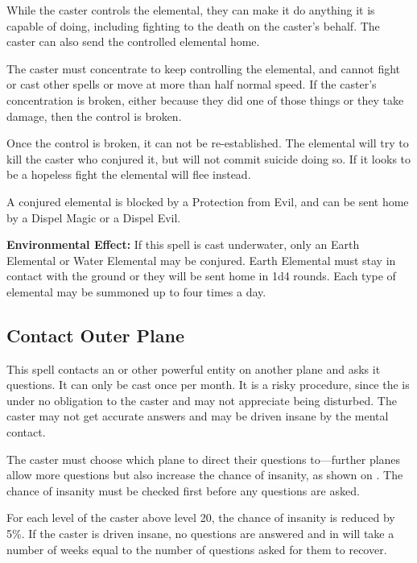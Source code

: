 \begin{multicols*}{2}
While the caster controls the elemental, they can make it do anything it is capable of doing, including fighting to the death on the caster’s behalf. The caster can also send the controlled elemental home.

The caster must concentrate to keep controlling the elemental, and cannot fight or cast other spells or move at more than half normal speed. If the caster’s concentration is broken, either because they did one of those things or they take damage, then the control is broken.

Once the control is broken, it can not be re-established. The elemental will try to kill the caster who conjured it, but will not commit suicide doing so. If it looks to be a hopeless fight the elemental will flee instead.

A conjured elemental is blocked by a Protection from Evil, and can be sent home by a Dispel Magic or a Dispel Evil.

\textbf{Environmental Effect:} If this spell is cast underwater, only an Earth Elemental or Water Elemental may be conjured. Earth Elemental must stay in contact with the ground or they will be sent home in 1d4 rounds. Each type of elemental may be summoned up to four times a day.

\subsection{Contact Outer Plane}\label{spell:Contact Outer Plane}

This spell contacts an  or other powerful entity on another plane and asks it questions. It can only be cast once per month. It is a risky procedure, since the  is under no obligation to the caster and may not appreciate being disturbed. The caster may not get accurate answers and may be driven insane by the mental contact.

The caster must choose which plane to direct their questions to—further planes allow more questions but also increase the chance of insanity, as shown on . The chance of insanity must be checked first before any questions are asked.

For each level of the caster above level 20, the chance of insanity is reduced by 5\%. If the caster is driven insane, no questions are answered and in will take a number of weeks equal to the number of questions asked for them to recover.


\end{multicols*}
